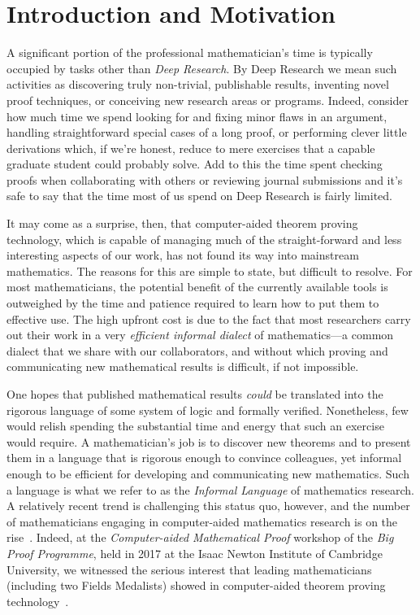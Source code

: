 \documentclass[11pt]{amsart}  %
\begin{document}
\clearpage

\section{Introduction and Motivation}
A significant portion of the professional mathematician's time is typically occupied by tasks other than \textit{Deep Research}. By Deep Research we mean such activities as discovering truly non-trivial, publishable results, inventing novel proof techniques, or conceiving new research areas or programs. Indeed, consider how much time we spend looking for and fixing minor flaws in an argument, handling straightforward special cases of a long proof, or performing clever little derivations which, if we're honest, reduce to mere exercises that a capable graduate student could probably solve.  Add to this the time spent checking proofs when collaborating with others or reviewing journal submissions and it's safe to say that the time most of us spend on Deep Research is fairly limited.

It may come as a surprise, then, that computer-aided theorem proving technology, which is capable of managing much of the straight-forward and less interesting aspects of our work, has not found its way into mainstream mathematics. The reasons for this are simple to state, but difficult to resolve. For most mathematicians, the potential benefit of the currently available tools is outweighed by the time and patience required to learn how to put them to effective use.  The high upfront cost is due to the fact that most researchers carry out their work in a very \emph{efficient informal dialect} of mathematics---a common dialect that we share with our collaborators, and without which proving and communicating new mathematical results is difficult, if not impossible.

One hopes that published mathematical results \emph{could} be translated into  the rigorous language of some system of logic and formally verified. Nonetheless, few would relish spending the substantial time and energy that such an exercise would require. A mathematician's job is to discover new theorems and to present them in a language that is rigorous enough to convince colleagues, yet informal enough to be efficient for developing and communicating new mathematics. Such a language is what we refer to as the \emph{Informal Language} of mathematics research. A relatively recent trend is challenging this status quo, however, and the number of mathematicians engaging in computer-aided mathematics research is on the rise~\cite{gowers:2017,harris:2015,pierce:2009}. Indeed, at the \emph{Computer-aided Mathematical Proof} workshop of the \emph{Big Proof Programme}, held in 2017 at the Isaac Newton Institute of Cambridge University, 
we witnessed the serious interest that leading mathematicians (including two Fields Medalists) showed in computer-aided theorem proving technology~\cite{bigproof:2017}.
\end{document}
